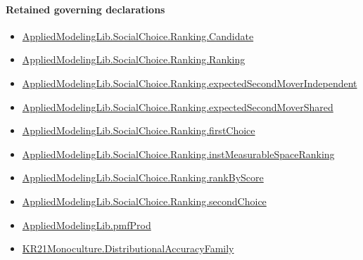 \documentclass[10pt]{article}
\begin{document}
\paragraph{Retained governing declarations}
\begin{itemize}\raggedright
\item \hyperlink{library-prerequisite-8c0e6c25845ae78a}{Applied\allowbreak{}Modeling\allowbreak{}Lib.\allowbreak{}Social\allowbreak{}Choice.\allowbreak{}Ranking.\allowbreak{}Candidate}
\item \hyperlink{library-prerequisite-5cde54446d1ae021}{Applied\allowbreak{}Modeling\allowbreak{}Lib.\allowbreak{}Social\allowbreak{}Choice.\allowbreak{}Ranking.\allowbreak{}Ranking}
\item \hyperlink{governing-declaration-4f697449f42135d1}{Applied\allowbreak{}Modeling\allowbreak{}Lib.\allowbreak{}Social\allowbreak{}Choice.\allowbreak{}Ranking.\allowbreak{}expected\allowbreak{}Second\allowbreak{}Mover\allowbreak{}Independent}
\item \hyperlink{governing-declaration-864c9bb19be5af0d}{Applied\allowbreak{}Modeling\allowbreak{}Lib.\allowbreak{}Social\allowbreak{}Choice.\allowbreak{}Ranking.\allowbreak{}expected\allowbreak{}Second\allowbreak{}Mover\allowbreak{}Shared}
\item \hyperlink{governing-declaration-08e457479ee6cf15}{Applied\allowbreak{}Modeling\allowbreak{}Lib.\allowbreak{}Social\allowbreak{}Choice.\allowbreak{}Ranking.\allowbreak{}first\allowbreak{}Choice}
\item \hyperlink{governing-declaration-30ca9c740ef703ec}{Applied\allowbreak{}Modeling\allowbreak{}Lib.\allowbreak{}Social\allowbreak{}Choice.\allowbreak{}Ranking.\allowbreak{}inst\allowbreak{}Measurable\allowbreak{}Space\allowbreak{}Ranking}
\item \hyperlink{governing-declaration-c2e98278351275b0}{Applied\allowbreak{}Modeling\allowbreak{}Lib.\allowbreak{}Social\allowbreak{}Choice.\allowbreak{}Ranking.\allowbreak{}rank\allowbreak{}By\allowbreak{}Score}
\item \hyperlink{governing-declaration-25ac37baf58f31e2}{Applied\allowbreak{}Modeling\allowbreak{}Lib.\allowbreak{}Social\allowbreak{}Choice.\allowbreak{}Ranking.\allowbreak{}second\allowbreak{}Choice}
\item \hyperlink{governing-declaration-de8e2a8bfe221a38}{Applied\allowbreak{}Modeling\allowbreak{}Lib.\allowbreak{}pmf\allowbreak{}Prod}
\item \hyperlink{paper-prerequisite-ee564fa2921e1add}{KR21\allowbreak{}Monoculture.\allowbreak{}Distributional\allowbreak{}Accuracy\allowbreak{}Family}

\end{itemize}
\end{document}
